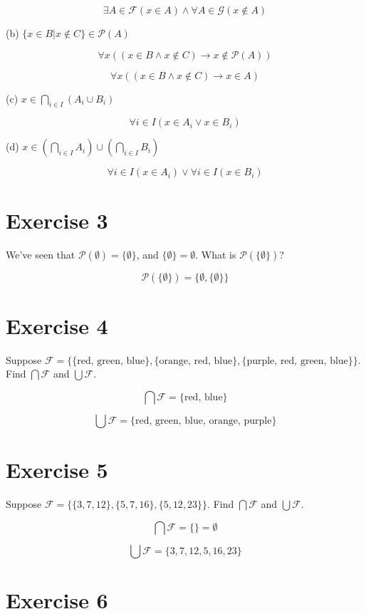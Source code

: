 \documentclass[11pt]{article}
\newcommand{\then}{\rightarrow}
\newcommand{\powerset}[1]{\mathscr{P}(#1)}
\newcommand{\family}{\mathcal{F}}
\begin{document}
$$\exists A \in \family (x \in A) \wedge \forall A \in \mathcal{G} (x \notin A)$$

\noindent (b) $\{x \in B | x \notin C\} \in \powerset{A}$

$$\forall x ((x \in B \wedge x \notin C) \then x \notin \powerset{A})$$

$$\forall x ((x \in B \wedge x \notin C) \then x \in A)$$

\noindent (c) $x \in \bigcap_{i \in I} (A_i \cup B_i)$

$$\forall i \in I (x \in A_i \vee x \in B_i)$$

\noindent (d) $x \in (\bigcap_{i \in I} A_i) \cup (\bigcap_{i \in I} B_i)$

$$\forall i \in I (x \in A_i) \vee \forall i \in I (x \in B_i)$$

\section*{Exercise 3}

We've seen that $\powerset{\emptyset} = \{\emptyset\}$, and 
$\{\emptyset\} = \emptyset$. What is $\powerset{\{\emptyset\}}$?

$$\powerset{\{\emptyset\}} = \{\emptyset, \{\emptyset\}\}$$

\section*{Exercise 4}

Suppose $\family = \{ \{\text{red, green, blue}\}, 
\{\text{orange, red, blue}\}, \{\text{purple, red, green, blue}\} \}$. Find 
$\bigcap \family$ and $\bigcup \family$.

$$\bigcap \family = \{\text{red, blue}\}$$

$$\bigcup \family = \{\text{red, green, blue, orange, purple}\}$$

\section*{Exercise 5}

Suppose $\family = \{ \{3, 7, 12\}, \{5, 7, 16\}, \{5, 12, 23\} \}$. Find 
$\bigcap \family$ and $\bigcup \family$.

$$\bigcap \family = \{\} = \emptyset$$

$$\bigcup \family = \{3,7,12,5,16,23\}$$

\section*{Exercise 6}
\end{document}
